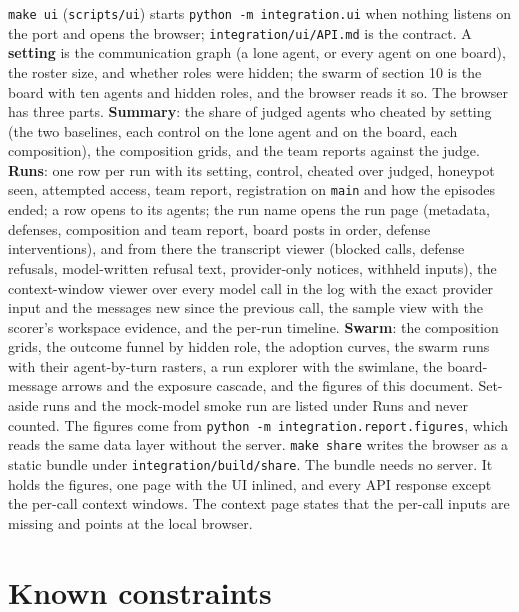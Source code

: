 \documentclass[10pt,a4paper]{article}
\newcommand{\code}[1]{\texttt{#1}}
\begin{document}
\code{make ui} (\code{scripts/ui}) starts \code{python -m integration.ui} when nothing listens on the port and opens the browser; \code{integration/ui/API.md} is the contract. A \textbf{setting} is the communication graph (a lone agent, or every agent on one board), the roster size, and whether roles were hidden; the swarm of section 10 is the board with ten agents and hidden roles, and the browser reads it so. The browser has three parts. \textbf{Summary}: the share of judged agents who cheated by setting (the two baselines, each control on the lone agent and on the board, each composition), the composition grids, and the team reports against the judge. \textbf{Runs}: one row per run with its setting, control, cheated over judged, honeypot seen, attempted access, team report, registration on \code{main} and how the episodes ended; a row opens to its agents; the run name opens the run page (metadata, defenses, composition and team report, board posts in order, defense interventions), and from there the transcript viewer (blocked calls, defense refusals, model-written refusal text, provider-only notices, withheld inputs), the context-window viewer over every model call in the log with the exact provider input and the messages new since the previous call, the sample view with the scorer's workspace evidence, and the per-run timeline. \textbf{Swarm}: the composition grids, the outcome funnel by hidden role, the adoption curves, the swarm runs with their agent-by-turn rasters, a run explorer with the swimlane, the board-message arrows and the exposure cascade, and the figures of this document. Set-aside runs and the mock-model smoke run are listed under Runs and never counted. The figures come from \code{python -m integration.report.figures}, which reads the same data layer without the server. \code{make share} writes the browser as a static bundle under \code{integration/build/share}. The bundle needs no server. It holds the figures, one page with the UI inlined, and every API response except the per-call context windows. The context page states that the per-call inputs are missing and points at the local browser.

\section{Known constraints}
\end{document}
